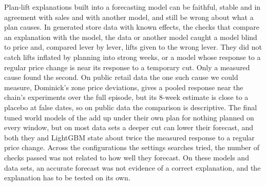 Plan-lift explanations built into a forecasting model can be faithful, stable
and in agreement with sales and with another model, and still be wrong about
what a plan causes. In generated store data with known effects, the checks that
compare an explanation with the model, the data or another model caught a model
blind to price and, compared lever by lever, lifts given to the wrong lever.
They did not catch lifts inflated by planning into strong weeks, or a model
whose response to a regular price change is near its response to a temporary
cut. Only a measured cause found the second. On public retail data the one such
cause we could measure, Dominick's zone price deviations, gives a pooled
response near the chain's experiments over the full episode, but its 8-week
estimate is close to a placebo at false dates, so on public data the comparison
is descriptive. The final tuned world models of the \companion{}  add up
under their own plan for nothing planned on every window, but on most data sets
a deeper cut can lower their forecast, and both they and LightGBM state about
twice the measured response to a regular price change. Across the
configurations the settings searches tried, the number of checks passed was not
related to how well they forecast. On these models and data sets, an accurate
forecast was not evidence of a correct explanation, and the explanation has to
be tested on its own.
